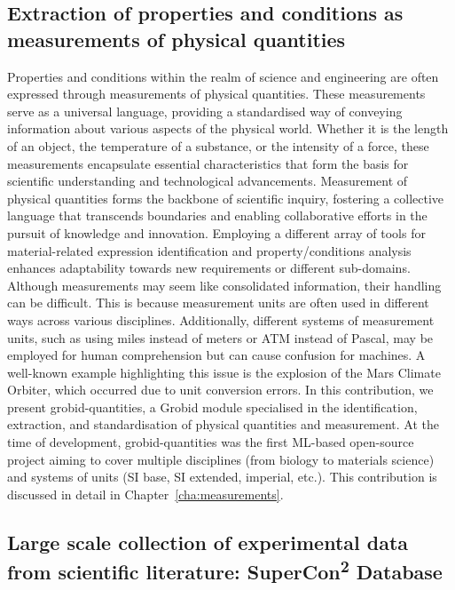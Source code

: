 \subsection{Extraction of properties and conditions as measurements of physical quantities}
\label{sec:intro-ner-quantities}

Properties and conditions within the realm of science and engineering are often expressed through measurements of physical quantities. These measurements serve as a universal language, providing a standardised way of conveying information about various aspects of the physical world. Whether it is the length of an object, the temperature of a substance, or the intensity of a force, these measurements encapsulate essential characteristics that form the basis for scientific understanding and technological advancements.
Measurement of physical quantities forms the backbone of scientific inquiry, fostering a collective language that transcends boundaries and enabling collaborative efforts in the pursuit of knowledge and innovation.
Employing a different array of tools for material-related expression identification and property/conditions analysis enhances adaptability towards new requirements or different sub-domains.
Although measurements may seem like consolidated information, their handling can be difficult. This is because measurement units are often used in different ways across various disciplines. Additionally, different systems of measurement units, such as using miles instead of meters or ATM instead of Pascal, may be employed for human comprehension but can cause confusion for machines. A well-known example highlighting this issue is the explosion of the Mars Climate Orbiter, which occurred due to unit conversion errors.
In this contribution, we present grobid-quantities, a Grobid module specialised in the identification, extraction, and standardisation of physical quantities and measurement. At the time of development, grobid-quantities was the first ML-based open-source project aiming to cover multiple disciplines (from biology to materials science) and systems of units (SI base, SI extended, imperial, etc.). 
This contribution is discussed in detail in Chapter~\ref{cha:measurements}.


\subsection{Large scale collection of experimental data from scientific literature: SuperCon\texorpdfstring{\textsuperscript{2}}{2} Database}
\label{sec:intro-supercon2}

